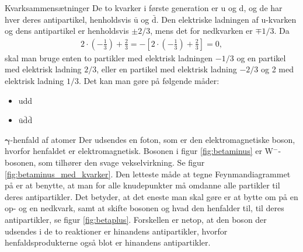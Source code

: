 \begin{opgave}{Kvarksammensætninger}
    De to kvarker i første generation er u og d, og de har hver deres antipartikel, henholdsvis $\bar{\mathrm u}$ og $\bar{\mathrm d}$. Den elektriske ladningen af u-kvarken og dens antipartikel er henholdsvis $\pm2/3$, mens det for nedkvarken er $\mp1/3$. Da
    \begin{align*}
        2\cdot\left(-\frac{1}{3}\right) + \frac{2}{3} = -\left[2\cdot\left(-\frac{1}{3}\right) + \frac{2}{3}\right] = 0,
    \end{align*}
    skal man bruge enten to partikler med elektrisk ladningen $-1/3$ og en partikel med elektrisk ladning $2/3$, eller en partikel med elektrisk ladning $-2/3$ og 2 med elektrisk ladning $1/3$. Det kan man gøre på følgende måder:
    \begin{itemize}
        \item udd
        \item $\bar{\mathrm u}\bar{\mathrm d}\bar{\mathrm d}$
    \end{itemize}
\end{opgave}

\begin{opgave}{$\mathbf{\gamma}$-henfald af atomer}
    \opg Der udsendes en foton, som er den elektromagnetiske boson, hvorfor henfaldet er elektromagnetisk.
    \opg Bosonen i figur \ref{fig:betaminus} er W$^-$-bosonen, som tilhører den svage vekselvirkning.
    \opg Se figur \ref{fig:betaminus_med_kvarker}.
    \opg Den letteste måde at tegne Feynmandiagrammet på er at benytte, at man for alle knudepunkter må omdanne alle partikler til deres antipartikler. Det betyder, at det eneste man skal gøre er at bytte om på en op- og en nedkvark, samt at skifte bosonen og hvad den henfalder til, til deres antipartikler, se figur \ref{fig:betaplus}.
    \opg Forskellen er netop, at den boson der udsendes i de to reaktioner er hinandens antipartikler, hvorfor henfaldsprodukterne også blot er hinandens antipartikler.
\end{opgave}

